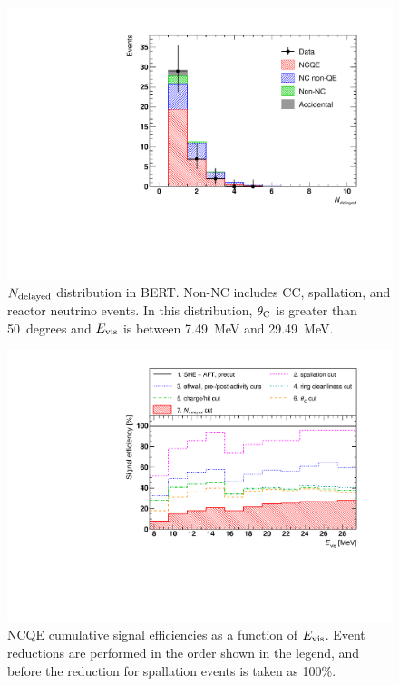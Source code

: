 \begin{figure}[h]
	\centering
	\includegraphics[width=12cm]{PDF/Figure04/FTFP_BERT_HP/Figure04_Poisson}
	\caption[$N_{\rm delayed}$ distribution in BERT]{
	$N_{\rm delayed}$ distribution in BERT.
	Non-NC includes CC, spallation, and reactor neutrino events.
	In this distribution, $\theta_{\rm C}$ is greater than 50~degrees and $E_{\rm vis}$ is between 7.49~MeV and 29.49~MeV.
	}\label{FTFP_BERT_HP_Figure04_Poisson}
\end{figure}

\begin{figure}[h]
	\centering
	\includegraphics[width=12cm]{PDF/Figure05/FTFP_BERT_HP/Figure05}
	\caption[NCQE cumulative signal efficiencies as a function of $E_{\rm vis}$]{
	NCQE cumulative signal efficiencies as a function of $E_{\rm vis}$.
	Event reductions are performed in the order shown in the legend, and before the reduction for spallation events is taken as 100\%.
	}\label{BERT_Figure05}
\end{figure}

